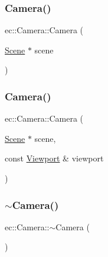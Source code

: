 \subsubsection{\texorpdfstring{Camera()}{Camera()}\hspace{0.1cm}{\footnotesize\ttfamily [1/2]}}
{\footnotesize\ttfamily ec\+::\+Camera\+::\+Camera (\begin{DoxyParamCaption}\item[{\mbox{\hyperlink{classec_1_1_scene}{Scene}} $\ast$}]{scene }\end{DoxyParamCaption})\hspace{0.3cm}{\ttfamily [explicit]}}

\mbox{\label{classec_1_1_camera_ab5fa55c91ae586754b613c3e8f33b31c}} 
\subsubsection{\texorpdfstring{Camera()}{Camera()}\hspace{0.1cm}{\footnotesize\ttfamily [2/2]}}
{\footnotesize\ttfamily ec\+::\+Camera\+::\+Camera (\begin{DoxyParamCaption}\item[{\mbox{\hyperlink{classec_1_1_scene}{Scene}} $\ast$}]{scene,  }\item[{const \mbox{\hyperlink{classec_1_1_viewport}{Viewport}} \&}]{viewport }\end{DoxyParamCaption})\hspace{0.3cm}{\ttfamily [explicit]}}

\mbox{\label{classec_1_1_camera_a11d706554e37d6dde0b9313a445cbd4b}} 
\subsubsection{\texorpdfstring{$\sim$\+Camera()}{~Camera()}}
{\footnotesize\ttfamily ec\+::\+Camera\+::$\sim$\+Camera (\begin{DoxyParamCaption}{ }\end{DoxyParamCaption})\hspace{0.3cm}{\ttfamily [default]}}



